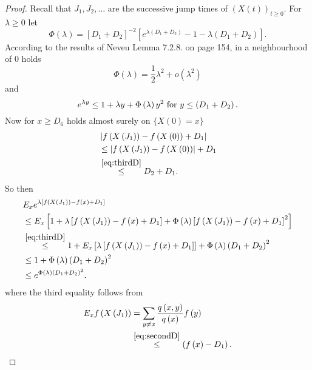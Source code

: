 \documentclass[12pt,a4paper]{scrartcl}
\numberwithin{equation}{section}
\begin{document}
\begin{proof}
Recall that $J_1, J_2, \ldots$ are the successive jump times of $\left(X\left(t\right) \right)_{t \geq 0}$. For $\lambda \geq 0$ let 
$$ \Phi\left(\lambda\right) = \left[D_1 + D_2 \right]^{-2} \left[e^{\lambda \left(D_1+D_2 \right)} -1 - \lambda\left(D_1 + D_2\right) \right]. $$
According to the results of Neveu \cite{neveu} Lemma 7.2.8. on page 154, in a neighbourhood of $0$ holds
\begin{equation} \label{eq:landauasymp}
\Phi\left(\lambda\right) = \frac{1}{2} \lambda^2  + o\left(\lambda^2\right)
\end{equation}
and
$$e^{\lambda y } \leq 1 + \lambda y + \Phi\left(\lambda\right) y^2 \textnormal{ for } y \leq \left(D_1+D_2\right).$$
Now for $x \geq D_6$ holds almost surely on $ \lbrace X\left(0\right) = x \rbrace $
\begin{align*}
&\left|f\left(X\left(J_1\right) \right) - f\left(X\left(0\right)\right) + D_1 \right| \\
&\leq \left|f\left(X\left(J_1\right) \right) - f\left(X\left(0\right)\right)\right| + D_1 \\
& \overset{ \eqref{eq:thirdD}}{\leq} D_2 + D_1.
\end{align*}
So then
\begin{align*}
&E_x e^{\lambda \left[f\left(X\left(J_1\right) \right) -  f\left(x\right) + D_1 \right]} \\
&\leq E_x \left[ 1 + \lambda \left[f\left(X\left(J_1\right) \right) - f\left(x\right) + D_1 \right] + \Phi\left(\lambda\right)\left[f\left(X\left(J_1\right) \right) - f\left(x\right) + D_1 \right]^2\right] \\
&\overset{ \eqref{eq:thirdD}}{\leq} 1 + E_x \left[ \lambda \left[f\left(X\left(J_1\right) \right) - f\left(x\right) + D_1 \right] \right] + \Phi\left(\lambda\right) \left(D_1 + D_2\right)^2 \\
& \leq 1 + \Phi\left(\lambda\right) \left(D_1 + D_2\right)^2 \\
& \leq e^{\Phi\left(\lambda\right) \left(D_1 + D_2\right)^2 }.
\end{align*}
where the third equality follows from
\begin{align*}
E_x f\left(X\left(J_1\right) \right) &= \sum_{y \neq x} \frac{q\left(x,y\right)}{q\left(x\right)} f\left(y\right) \\
&\overset{\eqref{eq:secondD}}{\leq} \left(f\left(x\right) - D_1\right).
\end{align*}


\end{proof}
\end{document}
